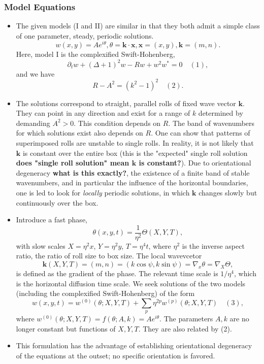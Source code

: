 \documentclass[12pt]{article}
\newcounter{solution}
\begin{document}
\subsubsection{Model Equations}
\begin{itemize}
    \item The given models (I and II) are similar in that they both admit a simple class of one parameter, steady, periodic solutions.
        \[
            w(x,y)=Ae^{i\theta}, \theta = \bm{k}\cdot \bm{x}, \bm{x}=(x,y), \bm{k}=(m,n).
        \] 
    Here, model I is the complexified Swift-Hohenberg,
    \[
        \partial_t w + (\Delta+1)^2w-Rw+w^2w^{*}=0 \quad (1),
    \] 
    and we have
    \[
        R-A^2 = (k^2-1)^2 \quad (2).
    \] 
    \item The solutions correspond to straight, parallel rolls of fixed wave vector $\bm{k}$. They can point in any direction and exist for a range of $k$ determined by demanding $A^2>0$. This condition depends on $R$. The band of wavenumbers for which solutions exist also depends on $R$. One can show that patterns of superimposed rolls are unstable to single rolls. In reality, it is not likely that $\bm{k}$ is constant over the entire box (this is the "expected" single roll solution \textbf{does "single roll solution" mean $\bm{k}$ is constant?}). Due to orientational degeneracy \textbf{what is this exactly?}, the existence of a finite band of stable wavenumbers, and in particular the influence of the horizontal boundaries, one is led to look for \emph{locally} periodic solutions, in which $\bm{k}$ changes slowly but continuously over the box. 
    \item Introduce a fast phase,
        \[
            \theta(x,y,t)=\frac{1}{\eta^2}\Theta(X,Y,T),
        \] 
        with slow scales $X=\eta^2 x$, $Y=\eta^2 y$, $T=\eta^4 t$, where $\eta^2$ is the inverse aspect ratio, the ratio of roll size to box size. The local wavevcetor
        \[
            \bm{k}(X,Y,T)=(m,n)=(k\cos\psi, k\sin\psi)=\nabla_x\theta = \nabla_X\Theta,
        \] 
        is defined as the gradient of the phase. The relevant time scale is $1/\eta^4$, which is the horizontal diffusion time scale. We seek solutions of the two models (including the complexified Swift-Hohenberg) of the form
        \[
            w(x,y,t) = w^{(0)}(\theta; X,Y,T)+\sum_{p}\eta^{2p}w^{(p)}(\theta;X,Y,T) \quad (3),
        \] 
        where $w^{(0)}(\theta;X,Y,T)=f(\theta;A,k)=Ae^{i\theta}$. The parameters $A,k$ are no longer constant but functions of $X,Y,T$. They are also related by (2).
    \item This formulation has the advantage of establishing orientational degeneracy of the equations at the outset; no specific orientation is favored.

\end{itemize}
\end{document}
